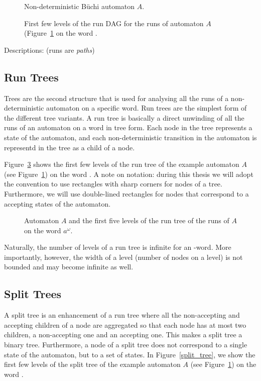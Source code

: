 \begin{figure}
\centering
\Automaton
\caption{Non-deterministic Büchi automaton $A$.}
\label{example_automaton_1}
\end{figure}

\begin{figure}
\centering
\RunDAG
\caption{First few levels of the run DAG for the runs of automaton $A$ (Figure~\ref{example_automaton_1} on the word \aom.}
\label{run_dag}
\end{figure}

Descriptions: \cite{fogarty2013unifying} (runs are \textit{paths})~\cite{2014_wilke}

\subsection{Run Trees}
Trees are the second structure that is used for analysing all the runs of a non-deterministic automaton on a specific word. Run trees are the simplest form of the different tree variants. A run tree is basically a direct unwinding of all the runs of an automaton on a word in tree form. Each node in the tree represents a state of the automaton, and each non-deterministic transition in the automaton is representd in the tree as a child of a node.

Figure~\ref{run_tree} shows the first few levels of the run tree of the example automaton $A$ (see Figure~\ref{example_automaton_1}) on the word \aom. A note on notation: during this thesis we will adopt the convention to use rectangles with sharp corners for nodes of a tree. Furthermore, we will use double-lined rectangles for nodes that correspond to a accepting states of the automaton.

\begin{figure}
\centering
\RunTree
\caption{Automaton $A$ and the first five levels of the run tree of the runs of $A$ on the word $a^\omega$.}
\label{run_tree}
\end{figure}

Naturally, the number of levels of a run tree is infinite for an \om-word. More importantly, however, the width of a level (number of nodes on a level) is not bounded and may become infinite as well. 



\subsection{Split Trees}
A split tree is an enhancement of a run tree where all the non-accepting and accepting children of a node are aggregated so that each node has at most two children, a non-accepting one and an accepting one. This makes a split tree a binary tree. Furthermore, a node of a split tree does not correspond to a single state of the automaton, but to a set of states. In Figure~\ref{split_tree}, we show the first few levels of the split tree of the example automaton $A$ (see Figure~\ref{example_automaton_1}) on the word \aom.

